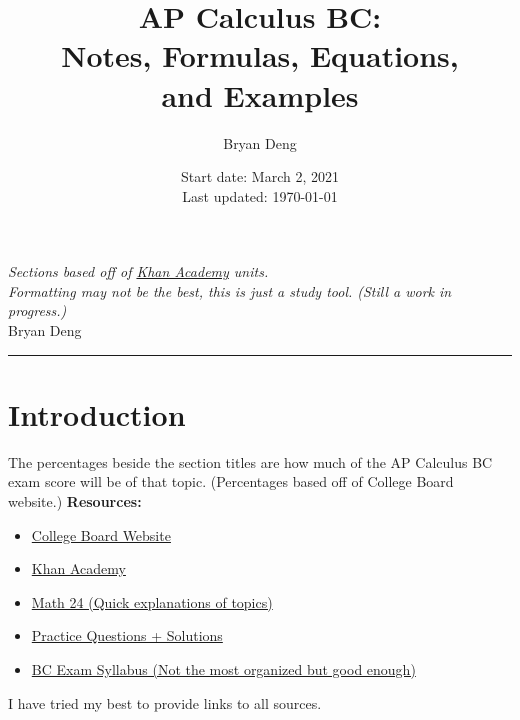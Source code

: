 \documentclass[12pt]{article}
\title{\textbf{AP Calculus BC:\\Notes, Formulas,  Equations,\\and Examples}}
\author{Bryan Deng}
\date{Start date: March 2, 2021\\Last updated: \today}
\begin{document}
    \maketitle
    \vfill
    \centering \textit{Sections based off of
        \href{https://www.khanacademy.org/math/ap-calculus-bc}{Khan Academy} units.
        \\ Formatting may not be the best, this is just a study tool. (Still a work in progress.)}
        \\  Bryan Deng
    \newpage

    \raggedright
    \tableofcontents
    \par\noindent\rule{\textwidth}{0.4pt} %
    \newpage

    \section*{Introduction}
        The percentages beside the section titles are how much of the AP Calculus BC exam score will be of that topic. (Percentages based off of College Board website.)
        \newline \newline
        \textbf{Resources:}
        \begin{itemize}
            \item \href{https://apstudents.collegeboard.org/courses/ap-calculus-bc}{College Board Website}
            \item \href{https://www.khanacademy.org/math/ap-calculus-bc}{Khan Academy}
            \item \href{https://www.math24.net/topics-calculus}{Math 24 (Quick explanations of topics)}
            \item \href{https://www.math.ucdavis.edu/~kouba/CalcOneDIRECTORY/}{Practice Questions + Solutions}
            \item \href{https://www.chelmsford.k12.ma.us/site/handlers/filedownload.ashx?moduleinstanceid=2496&dataid=7289&FileName=AP%20Calculus%20BC%20Syllabus.pdf}{BC Exam Syllabus (Not the most organized but good enough)}
        \end{itemize}
        I have tried my best to provide links to all sources.

    \raggedright
\end{document}

